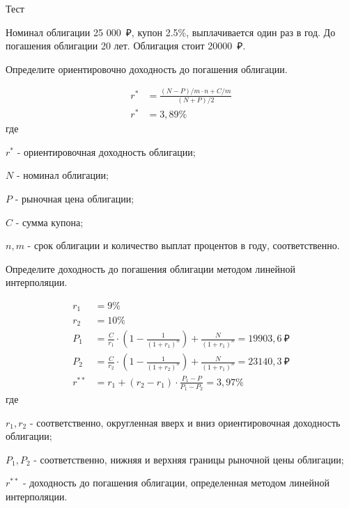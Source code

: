\documentclass[12pt, table, twoside, a4paper]{exam}
\begin{document}
\setcounter{section}{0\relax}%

\noindent

\normalsize
\begin{questions}

\question[9] Тест
\answerstotestShort
	
\question[20] Номинал облигации 25 000~₽, купон 2.5\%, выплачивается один раз в год. До погашения облигации 20 лет. Облигация стоит 20000~₽. 
\noaddpoints
\begin{subparts}
	\subpart[10] Определите ориентировочно доходность до погашения облигации.
	\begin{solution}[10em]
		\begin{align*}
		r^*&=\frac{(N-P)/m \cdot n + C/m }{(N+P)/2}\\
		r^*&=3,89\%
		\end{align*}
		где
		
		$r^*$ - ориентировочная доходность облигации;
		
		$N$ - номинал облигации;
		
		$P$ - рыночная цена облигации;
		
		$C$ - сумма купона;
		
		$n, m$ - срок облигации и количество выплат процентов в году, соответственно.
	\end{solution}
	
	\subpart[10] Определите доходность до погашения облигации методом линейной интерполяции.
	
	\begin{solution}[10em]
		\begin{align*}
		r_1&=9\%\\
		r_2&=10\%\\
		P_1&=\frac{C}{r_1} \cdot \left(1 - \frac{1}{(1+r_1)^n} \right) + \frac{N}{(1+r_1)^n}=19903,6~₽\\
		P_2&=\frac{C}{r_2} \cdot \left(1 - \frac{1}{(1+r_2)^n} \right) + \frac{N}{(1+r_1)^n}=23140,3~₽\\
		r^{**}&=r_1+(r_2-r_1) \cdot \frac{P_1-P}{P_1-P_2}=3,97\%
		\end{align*}	
		где
		
		$r_1, r_2$ - соответственно, округленная вверх и вниз ориентировочная доходность облигации;
		
		$P_1, P_2$ - соответственно, нижняя и верхняя границы рыночной цены облигации;
		
		$r^{**}$ - доходность до погашения облигации, определенная методом линейной интерполяции.
	\end{solution}
	

\end{subparts}
\end{questions}
\end{document}
